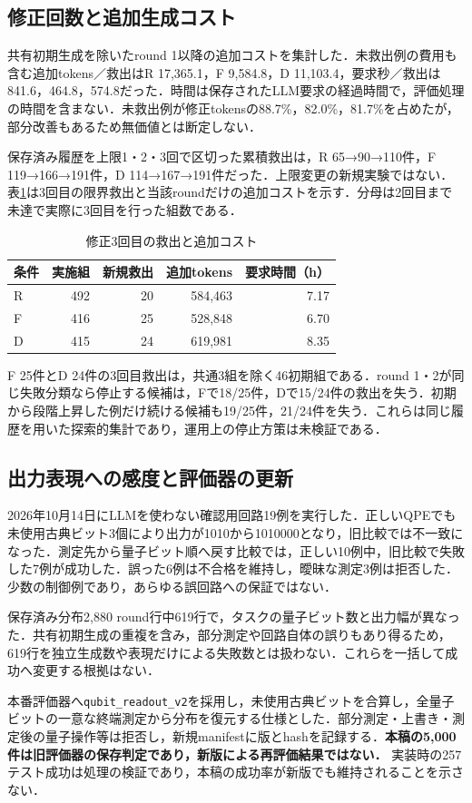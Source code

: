 \subsection{修正回数と追加生成コスト}
共有初期生成を除いたround 1以降の追加コストを集計した．未救出例の費用も含む追加tokens／救出はR 17,365.1，F 9,584.8，D 11,103.4，要求秒／救出は841.6，464.8，574.8だった．時間は保存されたLLM要求の経過時間で，評価処理の時間を含まない．未救出例が修正tokensの88.7\%，82.0\%，81.7\%を占めたが，部分改善もあるため無価値とは断定しない．

保存済み履歴を上限1・2・3回で区切った累積救出は，R 65→90→110件，F 119→166→191件，D 114→167→191件だった．上限変更の新規実験ではない．表\ref{tab:thirdround}は3回目の限界救出と当該roundだけの追加コストを示す．分母は2回目まで未達で実際に3回目を行った組数である．
\begin{table}[t]
\centering
\caption{修正3回目の救出と追加コスト}
\label{tab:thirdround}
\begin{tabular}{l|rrrr}\hline
条件 & 実施組 & 新規救出 & 追加tokens & 要求時間（h） \\\hline
R & 492 & 20 & 584,463 & 7.17 \\
F & 416 & 25 & 528,848 & 6.70 \\
D & 415 & 24 & 619,981 & 8.35 \\
\hline\end{tabular}
\end{table}
F 25件とD 24件の3回目救出は，共通3組を除く46初期組である．round 1・2が同じ失敗分類なら停止する候補は，Fで18/25件，Dで15/24件の救出を失う．初期から段階上昇した例だけ続ける候補も19/25件，21/24件を失う．これらは同じ履歴を用いた探索的集計であり，運用上の停止方策は未検証である．

\subsection{出力表現への感度と評価器の更新}
2026年10月14日にLLMを使わない確認用回路19例を実行した．正しいQPEでも未使用古典ビット3個により出力が1010から1010000となり，旧比較では不一致になった．測定先から量子ビット順へ戻す比較では，正しい10例中，旧比較で失敗した7例が成功した．誤った6例は不合格を維持し，曖昧な測定3例は拒否した．少数の制御例であり，あらゆる誤回路への保証ではない．

保存済み分布2,880 round行中619行で，タスクの量子ビット数と出力幅が異なった．共有初期生成の重複を含み，部分測定や回路自体の誤りもあり得るため，619行を独立生成数や表現だけによる失敗数とは扱わない．これらを一括して成功へ変更する根拠はない．

本番評価器へ\texttt{qubit\_readout\_v2}を採用し，未使用古典ビットを合算し，全量子ビットの一意な終端測定から分布を復元する仕様とした．部分測定・上書き・測定後の量子操作等は拒否し，新規manifestに版とhashを記録する．\textbf{本稿の5,000件は旧評価器の保存判定であり，新版による再評価結果ではない．} 実装時の257テスト成功は処理の検証であり，本稿の成功率が新版でも維持されることを示さない．
